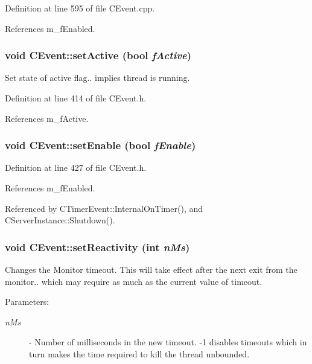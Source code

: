 Definition at line 595 of file CEvent.cpp.

References m\_\-f\-Enabled.
\subsubsection{\setlength{\rightskip}{0pt plus 5cm}void CEvent::set\-Active (bool {\em f\-Active})\hspace{0.3cm}{\tt  [inline, protected]}}\label{classCEvent_b0}


Set state of active flag.. implies thread is running.



Definition at line 414 of file CEvent.h.

References m\_\-f\-Active.
\subsubsection{\setlength{\rightskip}{0pt plus 5cm}void CEvent::set\-Enable (bool {\em f\-Enable})\hspace{0.3cm}{\tt  [inline]}}\label{classCEvent_a14}




Definition at line 427 of file CEvent.h.

References m\_\-f\-Enabled.

Referenced by CTimer\-Event::Internal\-On\-Timer(), and CServer\-Instance::Shutdown().
\subsubsection{\setlength{\rightskip}{0pt plus 5cm}void CEvent::set\-Reactivity (int {\em n\-Ms})}\label{classCEvent_a13}


Changes the Monitor timeout. This will take effect after the next exit from the monitor.. which may require as much as the current value of timeout. \begin{Desc}
\item[Parameters: ]\par
\begin{description}
\item[{\em 
n\-Ms}]- Number of milliseconds in the new timeout. -1 disables timeouts which in turn makes the time required to kill the thread unbounded. \end{description}
\end{Desc}


